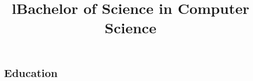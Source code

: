 \documentclass[12pt, tweaklist, line]{res}
\let\tempone\itemize
\let\temptwo\enditemize
\renewenvironment{itemize}{\tempone\vspace{-.15in}\setlength{\topsep}{0pt}\setlength{\itemsep}{3pt}\vspace{-.15in}}{\temptwo}
\begin{document}
\begin{resume}
\section{Education}
\begin{format}
  \\
  \title{l}\\
  \body\\
\end{format}

\title{Bachelor of Science in Computer Science}
\begin{position}
\end{position}


\end{resume}
\end{document}
